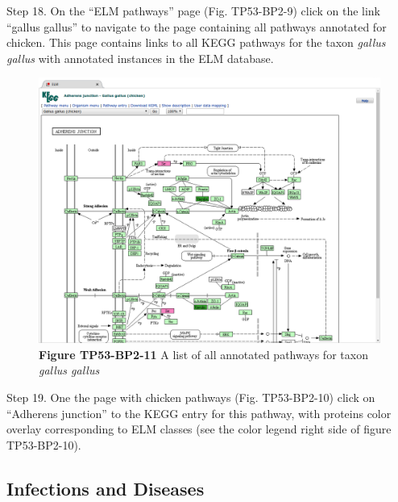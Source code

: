 Step 18. On the ``ELM pathways'' page (Fig. TP53-BP2-9) click on the
link ``gallus gallus'' to navigate to the page containing all pathways
annotated for chicken. This page contains links to all KEGG pathways for
the taxon \emph{gallus gallus} with annotated instances in the ELM
database.

\begin{figure}[h!]
\centering
\includegraphics[width=\textwidth]{Figures/TP53_2/pathways_kegg.png} 
\caption{
\textbf{Figure TP53-BP2-11}
A list of all annotated pathways for taxon \emph{gallus gallus}
}
\end{figure}

Step 19. One the page with chicken pathways (Fig. TP53-BP2-10) click on
``Adherens junction'' to the KEGG entry for this pathway, with proteins
color overlay corresponding to ELM classes (see the color legend right
side of figure TP53-BP2-10).

\subsection{Infections and Diseases}\label{infections-and-diseases}

